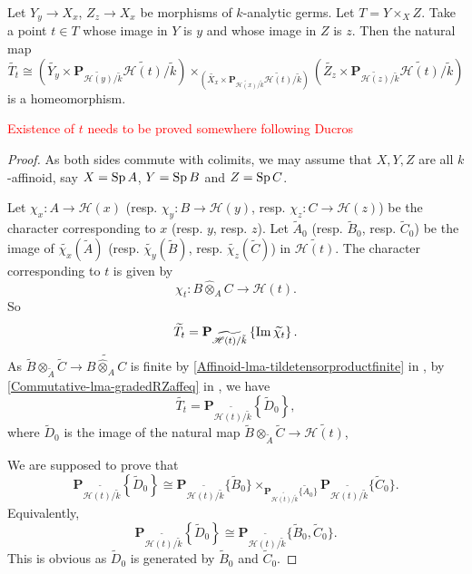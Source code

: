 \begin{lemma}\label{lma-fiberproductreduction1}
    Let $Y_y\rightarrow X_x$, $Z_z\rightarrow X_x$ be morphisms of $k$-analytic germs. Let $T=Y\times_X Z$. Take a point $t\in T$ whose image in $Y$ is $y$ and whose image in $Z$ is $z$. Then the natural map
    \[
        \widetilde{T_t}\cong \left(\widetilde{Y_y}\times \mathbf{P}_{\widetilde{\mathscr{H}(y)}/\tilde{k}}\widetilde{\mathscr{H}(t)}/\tilde{k}\right)\times_{\left(\widetilde{X_x}\times \mathbf{P}_{\widetilde{\mathscr{H}(x)}/\tilde{k}}\widetilde{\mathscr{H}(t)}/\tilde{k}\right)}\left(\widetilde{Z_z}\times \mathbf{P}_{\widetilde{\mathscr{H}(z)}/\tilde{k}}\widetilde{\mathscr{H}(t)}/\tilde{k}\right)  
    \]
    is a homeomorphism.
\end{lemma}
\textcolor{red}{Existence of $t$ needs to be proved somewhere following Ducros}
\begin{proof}
    As both sides commute with colimits, we may assume that $X,Y,Z$ are all $k$-affinoid, say $X=\operatorname{Sp} A$, $Y=\operatorname{Sp} B$ and $Z=\operatorname{Sp} C$.

    Let $\chi_x:A\rightarrow \mathscr{H}(x)$ (resp. $\chi_y:B\rightarrow \mathscr{H}(y)$, resp. $\chi_z:C\rightarrow \mathscr{H}(z)$) be the character corresponding to $x$ (resp. $y$, resp. $z$).
    Let $\tilde{A}_0$ (resp. $\tilde{B}_0$, resp. $\tilde{C}_0$) be the image of $\widetilde{\chi_x}(\tilde{A})$ (resp. $\widetilde{\chi_y}(\tilde{B})$, resp. $\widetilde{\chi_z}(\tilde{C})$) in $\widetilde{\mathscr{H}(t)}$. 
    The character corresponding to $t$ is given by
    \[
        \chi_t:B\hat{\otimes}_A C\rightarrow \mathscr{H}(t). 
    \]
    So
    \[
        \widetilde{T_t}=  \mathbf{P}_{\widetilde{\mathscr{H}(t)/\tilde{k}}}\left\{ \operatorname{Im} \widetilde{\chi_t}\right\}.
    \]
    As $\tilde{B}\otimes_{\tilde{A}}\tilde{C}\rightarrow \widetilde{B\hat{\otimes}_A C}$ is finite by \cref{Affinoid-lma-tildetensorproductfinite} in , by \cref{Commutative-lma-gradedRZaffeq} in , we have
    \[
        \widetilde{T_t}=  \mathbf{P}_{\widetilde{\mathscr{H}(t)/\tilde{k}}}\left\{ \tilde{D}_0\right\}, 
    \]
    where $\tilde{D}_0$ is the image of the natural map $\tilde{B}\otimes_{\tilde{A}}\tilde{C}\rightarrow \widetilde{\mathscr{H}(t)}$,
    
    We are supposed to prove that 
    \[
        \mathbf{P}_{\widetilde{\mathscr{H}(t)/\tilde{k}}}\left\{ \tilde{D}_0\right\}\cong \mathbf{P}_{\widetilde{\mathscr{H}(t)/\tilde{k}}}\{\tilde{B}_0\} \times_{\mathbf{P}_{\widetilde{\mathscr{H}(t)/\tilde{k}}}\{\tilde{A}_0\}}\mathbf{P}_{\widetilde{\mathscr{H}(t)/\tilde{k}}}\{\tilde{C}_0\}.
    \]
    Equivalently,
    \[
        \mathbf{P}_{\widetilde{\mathscr{H}(t)/\tilde{k}}}\left\{ \tilde{D}_0\right\}\cong \mathbf{P}_{\widetilde{\mathscr{H}(t)/\tilde{k}}}\{\tilde{B}_0,\tilde{C}_0\}. 
    \]
    This is obvious as $\tilde{D}_0$ is generated by $\tilde{B}_0$ and $\tilde{C}_0$.
\end{proof}


